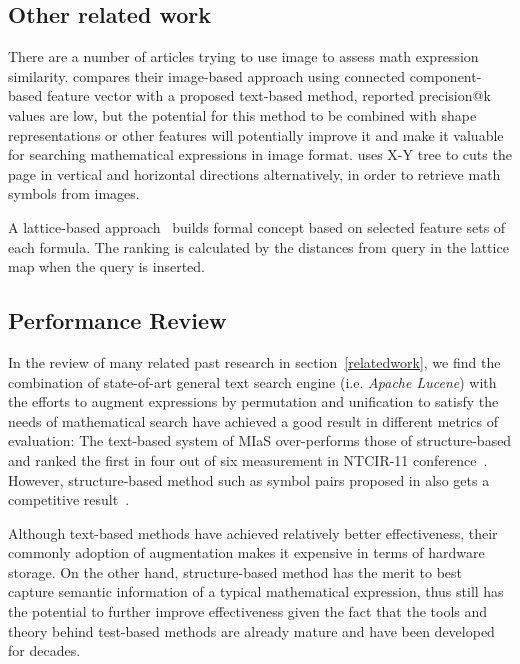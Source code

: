 \subsection{Other related work}
There are a number of articles trying to use image to assess math expression similarity. \cite{imageb11} compares their image-based approach using connected component-based feature vector with a proposed text-based method, reported precision@k values are low, but the potential for this method to be combined with shape representations or other features will potentially improve it and make it valuable for searching mathematical expressions in image format. 
\cite{handwrite} uses \mbox{X-Y} tree to cuts the page in vertical and horizontal directions alternatively, in order to retrieve math symbols from images. 

A lattice-based approach~\cite{lattice} builds formal concept based on selected feature sets of each formula. The ranking is calculated by the distances from query in the lattice map when the query is inserted. 

\subsection{Performance Review}
In the review of many related past research in section~\ref{relatedwork}, we find the combination of state-of-art general text search engine (i.e. \textit{Apache Lucene}) with the efforts to augment expressions by permutation and unification to satisfy the needs of mathematical search have achieved a good result in different metrics of evaluation: 
The text-based system of MIaS over-performs those of structure-based and ranked the first in four out of six measurement in NTCIR-11 conference~\cite{NTCIR11res}. 
However, structure-based method such as symbol pairs proposed in \cite{symbolpairs15,symbolpair15:2} also gets a competitive result~\cite{NTCIR11res}. 

Although text-based methods have achieved relatively better effectiveness, their commonly adoption of augmentation makes it expensive in terms of hardware storage. 
On the other hand, structure-based method has the merit to best capture semantic information of a typical mathematical expression, thus still has the potential to further improve effectiveness given the fact that the tools and theory behind test-based methods are already mature and have been developed for decades.
